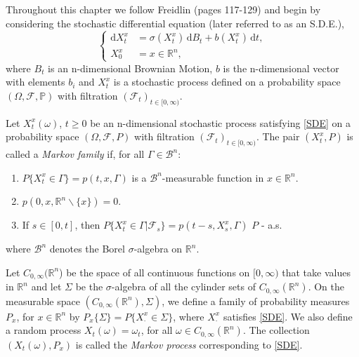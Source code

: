 \documentclass[a4paper,12pt,draft]{report}
\begin{document}
Throughout this chapter we follow Freidlin \cite{Freidlin} (pages 117-129) and begin by considering the stochastic differential equation (later referred to as an S.D.E.),
\begin{equation}
\left\{
\begin{aligned}
\mathrm{d}X_t^x & = \sigma(X_t^x)\,\mathrm{d}B_t + b(X_t^x)\,\mathrm{d}t,\\ \label{SDE}
X_0^x & = x \in \mathbb{R}^n,
\end{aligned}
\right.
\end{equation}
where $B_t$ is an n-dimensional Brownian Motion, $b$ is the n-dimensional vector with elements $b_i$ and $X_t^x$ is a stochastic process defined on a probability space $(\Omega, \mathscr{F}, \mathbb{P})$ with filtration $(\mathscr{F}_t)_{t \in [0, \infty)}$.
{
Let $X_t^x(\omega)$, $t \ge 0$ be an n-dimensional stochastic process satisfying \eqref{SDE} on a probability space $(\Omega, \mathscr{F}, P)$ with filtration $(\mathscr{F}_t)_{t \in [0, \infty)}$.  The pair $(X_t^x, P)$ is called a \emph{Markov family} if, for all $\Gamma \in \mathscr{B}^n$:
\begin{enumerate}
\item $P\{X_t^x \in \Gamma\} = p(t , x, \Gamma)$ is a $\mathscr{B}^n$-measurable function in $x \in \mathbb{R}^n$.
\item $p(0, x, \mathbb{R}^n\smallsetminus\{x\}) = 0$.
\item If $s \in [0, t]$, then $P\{X_t^x \in \Gamma | \mathscr{F}_s\} = p(t - s, X_s^x, \Gamma)$ $P$ - a.s.
\end{enumerate}
where $\mathscr{B}^n$ denotes the Borel $\sigma$-algebra on $\mathbb{R}^n$.
}
{
Let $C_{0, \infty}(\mathbb{R}^n$) be the space of all continuous functions on $[0, \infty)$ that take values in $\mathbb{R}^n$ and let $\Sigma$ be the $\sigma$-algebra of all the cylinder sets of $C_{0, \infty}(\mathbb{R}^n)$. On the measurable space $(C_{0, \infty}(\mathbb{R}^n), \Sigma)$, we define a family of probability measures $P_x$, for $x \in \mathbb{R}^n$ by $P_x\{\Sigma\} = P\{X_\cdot^x \in \Sigma\}$, where $X_\cdot^x$ satisfies \eqref{SDE}.  We also define a random process $X_t(\omega) = \omega_t$, for all $\omega \in C_{0, \infty}(\mathbb{R}^n)$.  The collection $(X_t(\omega), P_x)$ is called the \emph{Markov process} corresponding to \eqref{SDE}.
}
\end{document}
